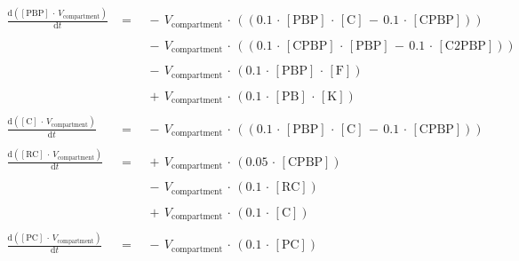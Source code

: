 $$\begin{array}{ccl}
\frac {\mathrm{d}\left( {{\mathrm{[PBP]}} \, \cdot \, {V}_{\mathrm{compartment}} } \right) }  {\mathrm{d}{t} }  \; &=& \;  { \, - \, {V}_{\mathrm{compartment}} \, \cdot \, \left(\left( {{0.1} \, \cdot \, {\mathrm{[PBP]}} \, \cdot \, {\mathrm{[C]}} \, - \, {0.1} \, \cdot \, {\mathrm{[CPBP]}} } \right)\right) } \\ 
 && \\ 
 \; && \;  { \, - \, {V}_{\mathrm{compartment}} \, \cdot \, \left(\left( {{0.1} \, \cdot \, {\mathrm{[CPBP]}} \, \cdot \, {\mathrm{[PBP]}} \, - \, {0.1} \, \cdot \, {\mathrm{[C2PBP]}} } \right)\right) } \\ 
 && \\ 
 \; && \;  { \, - \, {V}_{\mathrm{compartment}} \, \cdot \, \left( {{0.1} \, \cdot \, {\mathrm{[PBP]}} \, \cdot \, {\mathrm{[F]}} } \right) } \\ 
 && \\ 
 \; && \;  { \, + \, {V}_{\mathrm{compartment}} \, \cdot \, \left( {{0.1} \, \cdot \, {\mathrm{[PB]}} \, \cdot \, {\mathrm{[K]}} } \right) } \\ 
 && \\ 
\frac {\mathrm{d}\left( {{\mathrm{[C]}} \, \cdot \, {V}_{\mathrm{compartment}} } \right) }  {\mathrm{d}{t} }  \; &=& \;  { \, - \, {V}_{\mathrm{compartment}} \, \cdot \, \left(\left( {{0.1} \, \cdot \, {\mathrm{[PBP]}} \, \cdot \, {\mathrm{[C]}} \, - \, {0.1} \, \cdot \, {\mathrm{[CPBP]}} } \right)\right) } \\ 
 && \\ 
\frac {\mathrm{d}\left( {{\mathrm{[RC]}} \, \cdot \, {V}_{\mathrm{compartment}} } \right) }  {\mathrm{d}{t} }  \; &=& \;  { \, + \, {V}_{\mathrm{compartment}} \, \cdot \, \left( {{0.05} \, \cdot \, {\mathrm{[CPBP]}} } \right) } \\ 
 && \\ 
 \; && \;  { \, - \, {V}_{\mathrm{compartment}} \, \cdot \, \left( {{0.1} \, \cdot \, {\mathrm{[RC]}} } \right) } \\ 
 && \\ 
 \; && \;  { \, + \, {V}_{\mathrm{compartment}} \, \cdot \, \left( {{0.1} \, \cdot \, {\mathrm{[C]}} } \right) } \\ 
 && \\ 
\frac {\mathrm{d}\left( {{\mathrm{[PC]}} \, \cdot \, {V}_{\mathrm{compartment}} } \right) }  {\mathrm{d}{t} }  \; &=& \;  { \, - \, {V}_{\mathrm{compartment}} \, \cdot \, \left( {{0.1} \, \cdot \, {\mathrm{[PC]}} } \right) } \\ 
 && \\ 

\end{array}$$
